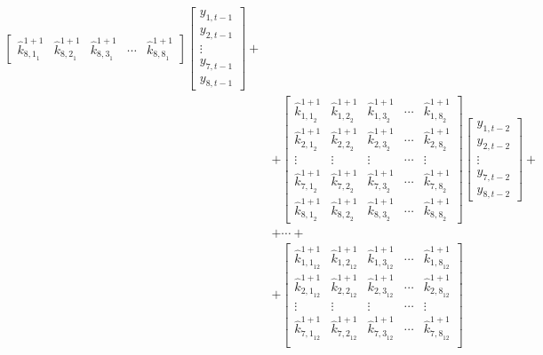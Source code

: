 \documentclass[a4paper,11pt,listof=nochaptergap,oneside,pointednumbers,bibtotoc,bigheadings,liststotoc]{scrbook}
\theoremstyle{mysatz}
\theoremstyle{mydefinition}
\theoremstyle{mybemerkung}
\let\oldhat\hat
\newcommand{\hattnobf}[1]{\oldhat{#1}}
\begin{document}
\begin{enumerate}
\begin{equation}
\begin{split}
\begin{bmatrix}
		{\hattnobf{k}_{{8, 1}_1}^{1+1}} & {\hattnobf{k}_{{8, 2}_1}^{1+1}} & {\hattnobf{k}_{{8, 3}_1}^{1+1}} & \cdots & {\hattnobf{k}_{{8, 8}_1}^{1+1}}
 		\end{bmatrix} 
		\begin{bmatrix}
    		y_{1,t-1} \\
    		y_{2,t-1} \\
		\vdots \\
		y_{7, t-1} \\
		y_{8, t-1}
 		\end{bmatrix} + \\
		& +
		\begin{bmatrix}
    		{\hattnobf{k}_{{1, 1}_2}^{1+1}} & {\hattnobf{k}_{{1, 2}_2}^{1+1}} & {\hattnobf{k}_{{1, 3}_2}^{1+1}} & \cdots & {\hattnobf{k}_{{1, 8}_2}^{1+1}}\\
    		{\hattnobf{k}_{{2, 1}_2}^{1+1}} & {\hattnobf{k}_{{2, 2}_2}^{1+1}} & {\hattnobf{k}_{{2, 3}_2}^{1+1}} & \cdots & {\hattnobf{k}_{{2, 8}_2}^{1+1}}\\
		\vdots & \vdots & \vdots & \cdots & \vdots \\
		{\hattnobf{k}_{{7, 1}_2}^{1+1}} & {\hattnobf{k}_{{7, 2}_2}^{1+1}} & {\hattnobf{k}_{{7, 3}_2}^{1+1}} & \cdots & {\hattnobf{k}_{{7, 8}_2}^{1+1}}\\
		{\hattnobf{k}_{{8, 1}_2}^{1+1}} & {\hattnobf{k}_{{8, 2}_2}^{1+1}} & {\hattnobf{k}_{{8, 3}_2}^{1+1}} & \cdots & {\hattnobf{k}_{{8, 8}_2}^{1+1}}
 		\end{bmatrix} 
		\begin{bmatrix}
    		y_{1,t-2} \\
    		y_{2,t-2} \\
		\vdots \\
		y_{7, t-2} \\
		y_{8, t-2}
 		\end{bmatrix} +\\
		& + \cdots + \\
		& + 
		\begin{bmatrix}
    		{\hattnobf{k}_{{1, 1}_{12}}^{1+1}} & {\hattnobf{k}_{{1, 2}_{12}}^{1+1}} & {\hattnobf{k}_{{1, 3}_{12}}^{1+1}} & \cdots & {\hattnobf{k}_{{1, 8}_{12}}^{1+1}}\\
    		{\hattnobf{k}_{{2, 1}_{12}}^{1+1}} & {\hattnobf{k}_{{2, 2}_{12}}^{1+1}} & {\hattnobf{k}_{{2, 3}_{12}}^{1+1}} & \cdots & {\hattnobf{k}_{{2, 8}_{12}}^{1+1}}\\
		\vdots & \vdots & \vdots & \cdots & \vdots \\
		{\hattnobf{k}_{{7, 1}_{12}}^{1+1}} & {\hattnobf{k}_{{7, 2}_{12}}^{1+1}} & {\hattnobf{k}_{{7, 3}_{12}}^{1+1}} & \cdots & {\hattnobf{k}_{{7, 8}_{12}}^{1+1}}\\

\end{bmatrix}
\end{split}
\end{equation}
\end{enumerate}
\end{document}
